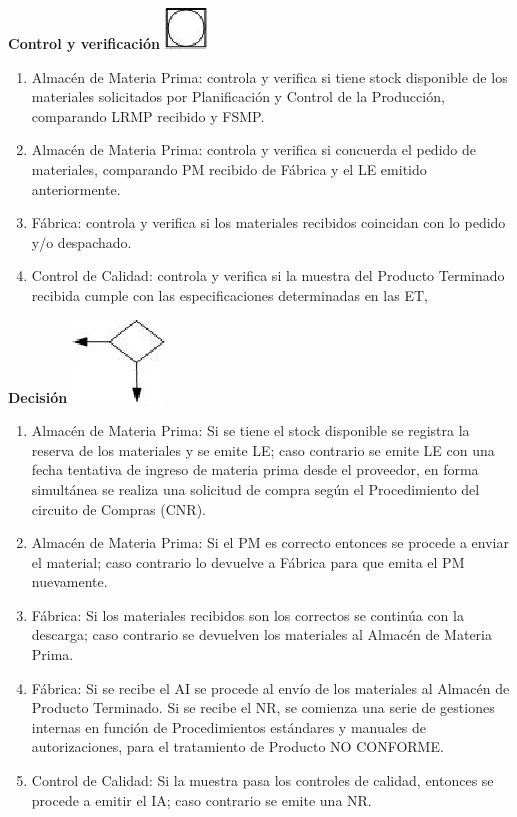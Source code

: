 \begin{center}
  \textbf{Control y verificación}
  \includegraphics{./Images/Simbolos/simbolo-Control-y-Verificacion.png}
\end{center}
\begin{enumerate}
  \item Almac\'en de Materia Prima: controla y verifica si tiene stock disponible de los materiales solicitados por Planificaci\'on y Control de la Producci\'on, comparando LRMP recibido y FSMP.
  \item Almac\'en de Materia Prima: controla y verifica si concuerda el pedido de materiales, comparando PM recibido de F\'abrica y el LE emitido anteriormente.
  \item F\'abrica: controla y verifica si los materiales recibidos coincidan con lo pedido y/o despachado.
  \item Control de Calidad: controla y verifica si la muestra del Producto Terminado recibida cumple con las especificaciones determinadas en las ET,
\end{enumerate}

\begin{center}
  \textbf{Decisión}
  \includegraphics{./Images/Simbolos/simbolo-Decision.png}
\end{center}
\begin{enumerate}
  \item Almac\'en de Materia Prima: Si se tiene el stock disponible se registra la reserva de los materiales y se emite LE; caso contrario se emite LE con una fecha tentativa de ingreso de materia prima desde el proveedor, en forma simult\'anea se realiza una solicitud de compra seg\'un el Procedimiento del circuito de Compras (CNR).
  \item Almac\'en de Materia Prima: Si el PM es correcto entonces se procede a enviar el material; caso contrario lo devuelve a F\'abrica para que emita el PM nuevamente.
  \item F\'abrica: Si los materiales recibidos son los correctos se contin\'ua con la descarga; caso contrario se devuelven los materiales al Almac\'en de Materia Prima.
  \item F\'abrica: Si se recibe el AI se procede al env\'io de los materiales al Almac\'en de Producto Terminado. Si se recibe el NR, se comienza una serie de gestiones internas en funci\'on de Procedimientos est\'andares y manuales de autorizaciones, para el tratamiento de Producto NO CONFORME.
  \item Control de Calidad: Si la muestra pasa los controles de calidad, entonces se procede a emitir el IA; caso contrario se emite una NR.
\end{enumerate}

